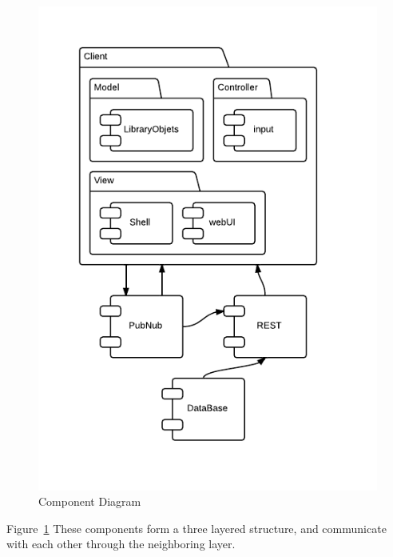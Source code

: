 \begin{figure}
\centering
\includegraphics[width=6in]{image/ComponentDiagram.png}
\caption{Component Diagram}
\label{figure:componentDiagram}
\end{figure}

Figure~\ref{figure:componentDiagram} These components form a three layered structure, and communicate with each other through the neighboring layer.




